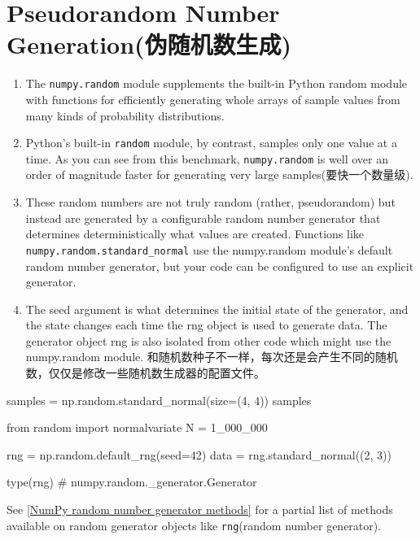 \section{Pseudorandom Number Generation(伪随机数生成)}
\begin{enumerate}
    \item The \verb|numpy.random| module supplements the built-in Python random module with functions for efficiently generating whole arrays of sample values from many kinds of probability distributions. 
    \item Python’s built-in \verb|random| module, by contrast, samples only one value at a time. As you can see from this benchmark, \verb|numpy.random| is well over an order of magnitude faster for generating very large samples(要快一个数量级).
    \item These random numbers are not truly random (rather, pseudorandom) but instead are generated by a configurable random number generator that determines deterministically what values are created. Functions like \verb|numpy.random.standard_normal| use the numpy.random module’s default random number generator, but your code can be configured to use an explicit generator.
    \item The seed argument is what determines the initial state of the generator, and the state changes each time the rng object is used to generate data. The generator object rng is also isolated from other code which might use the numpy.random module. 和随机数种子不一样，每次还是会产生不同的随机数，仅仅是修改一些随机数生成器的配置文件。
\end{enumerate}

\begin{pyc}
samples = np.random.standard_normal(size=(4, 4))
samples

from random import normalvariate
N = 1_000_000



rng = np.random.default_rng(seed=42)
data = rng.standard_normal((2, 3))

type(rng)
# numpy.random._generator.Generator
\end{pyc}

See \autoref{NumPy random number generator methods} for a partial list of methods available on random generator objects like \verb|rng|(random number generator).

